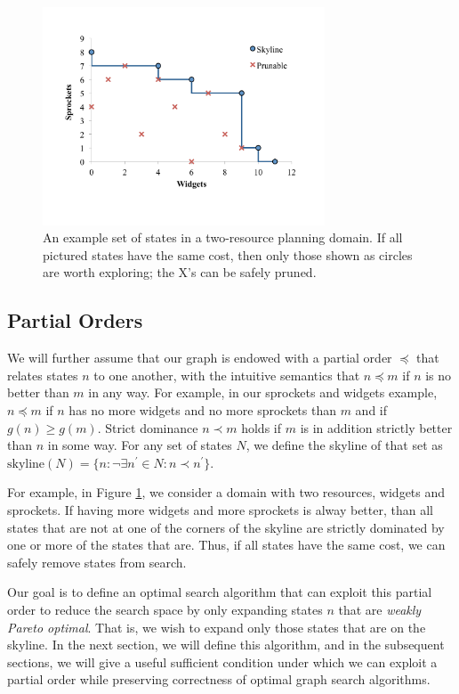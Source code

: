 \documentclass[letterpaper]{article}
\theoremstyle{plain} \newtheorem{theorem}{Theorem} \newtheorem{proposition}{Proposition} \newtheorem{lemma}{Lemma}
\theoremstyle{definition} \newtheorem{definition}{Definition} \newtheorem{conjecture}{Conjecture} \newtheorem*{example}{Example}
\theoremstyle{remark} \newtheorem*{remark}{Remark} \newtheorem*{note}{Note} \newtheorem{case}{Case}
\begin{document}
\begin{figure}
	\begin{center}
	\includegraphics[width=3.3in]{skyline2d.pdf}
\end{center}
  \caption{An example set of states in a two-resource planning domain. If
all pictured states have the same cost, then only those shown as circles are
worth exploring; the X's can be safely pruned.}
  \label{fig:skyline}
\end{figure}


\subsection{Partial Orders}

We will further assume that our graph is endowed with a partial
order $\preceq$ that relates states $n$ to one another, with the
intuitive semantics that $n \preceq m$ if $n$ is no better than $m$
in any way. For example, in our sprockets and widgets example, $n
\preceq m$ if $n$ has no more widgets and no more sprockets than
$m$ and if $g(n) \ge g(m)$. Strict dominance $n \prec m$ holds if
$m$ is in addition strictly better than $n$ in some way.  For any
set of states $N$, we define the skyline of that set as
$\textrm{skyline}(N)=\{n: \neg\exists n^\prime \in N: n \prec
n^\prime\}$. 

For example, in Figure \ref{fig:skyline}, we consider a domain with
two resources, widgets and sprockets. If having more widgets and
more sprockets is alway better, than all states that are not at one
of the corners of the skyline are strictly dominated by one or more
of the states that are.  Thus, if all states have the same cost,
we can safely remove states from search.

Our goal is to define an optimal search algorithm that can exploit
this partial order to reduce the search space by only expanding
states $n$ that are \textit{weakly Pareto optimal}. That is, we
wish to expand only those states that are on the skyline. In the
next section, we will define this algorithm, and in the subsequent
sections, we will give a useful sufficient condition under which
we can exploit a partial order while preserving correctness of
optimal graph search algorithms.
\end{document}
